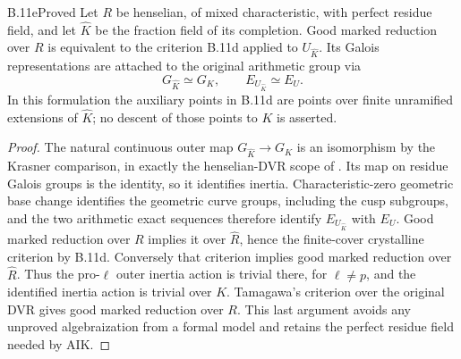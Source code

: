 \begin{claim}{B.11e}{Proved}
Let $R$ be henselian, of mixed characteristic, with perfect residue
field, and let $\widehat K$ be the fraction field of its completion.
Good marked reduction over $R$ is equivalent to the criterion B.11d
applied to $U_{\widehat K}$. Its Galois representations are attached
to the original arithmetic group via
\[
 G_{\widehat K}\simeq G_K,\qquad
 E_{U_{\widehat K}}\simeq E_U.
\]
In this formulation the auxiliary points in B.11d are points over
finite unramified extensions of $\widehat K$; no descent of those
points to $K$ is asserted.
\end{claim}
\begin{proof}
The natural continuous outer map $G_{\widehat K}\to G_K$ is an
isomorphism by the Krasner comparison, in exactly the henselian-DVR
scope of \citet[Lemma 3.1]{BC_MinTsuj2022}. Its map on residue Galois
groups is the identity, so it identifies inertia. Characteristic-zero
geometric base change identifies the geometric curve groups, including
the cusp subgroups, and the two arithmetic exact sequences therefore
identify $E_{U_{\widehat K}}$ with $E_U$.
Good marked reduction over $R$ implies it over $\widehat R$, hence
the finite-cover crystalline criterion by B.11d. Conversely that
criterion implies good marked reduction over $\widehat R$.
Thus the pro-$\ell$ outer inertia action is trivial there, for
$\ell\ne p$, and the identified inertia action is trivial over $K$.
Tamagawa's criterion over the original DVR gives good marked reduction
over $R$. This last argument avoids any unproved algebraization from
a formal model and retains the perfect residue field needed by AIK.
\end{proof}
